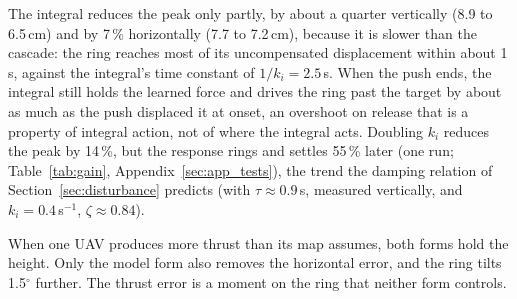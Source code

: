 The integral reduces the peak only partly, by about a quarter vertically (8.9 to 6.5\,cm) and by 7\,\%
horizontally (7.7 to 7.2\,cm), because it is slower than the cascade: the ring reaches most of its
uncompensated displacement within about 1\,s, against the integral's time constant of
$1/k_i = 2.5$\,s. When the push ends, the integral still holds the learned force and drives the ring past
the target by about as much as the push displaced it at onset, an overshoot on release that is a property
of integral action, not of where the integral acts. Doubling $k_i$ reduces the peak by
14\,\%, but the response rings and settles 55\,\% later (one run; Table~\ref{tab:gain},
Appendix~\ref{sec:app_tests}), the trend the damping relation of Section~\ref{sec:disturbance} predicts
(with $\tau \approx 0.9$\,s, measured vertically, and $k_i = 0.4$\,s$^{-1}$, $\zeta \approx 0.84$).

When one UAV produces more thrust than its map assumes, both forms hold the height. Only the model
form also removes the horizontal error, and the ring tilts 1.5$^\circ$ further. The thrust error is a
moment on the ring that neither form controls.



